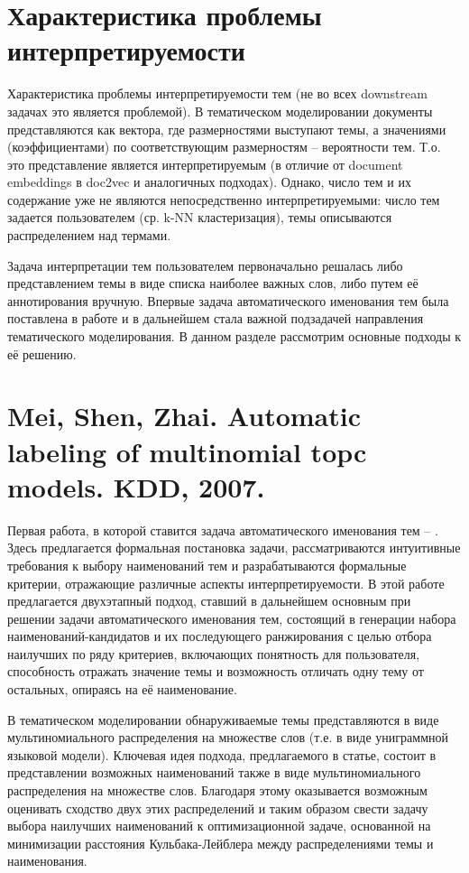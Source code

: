 \section{Характеристика проблемы интерпретируемости}

Характеристика проблемы интерпретируемости тем (не во всех downstream задачах это является проблемой). В тематическом моделировании документы представляются как вектора, где размерностями выступают темы, а значениями (коэффициентами) по соответствующим размерностям -- вероятности тем. Т.о. это представление является интерпретируемым (в отличие от document embeddings в doc2vec и аналогичных подходах). Однако, число тем и их содержание уже не являются непосредственно интерпретируемыми: число тем задается пользователем (ср. k-NN кластеризация), темы описываются распределением над термами.

Задача интерпретации тем пользователем первоначально решалась либо представлением темы в виде списка наиболее важных слов, либо путем её аннотирования вручную. Впервые задача автоматического именования тем была поставлена в работе \parencite{mei2007automatic} и в дальнейшем стала важной подзадачей направления тематического моделирования. В данном разделе рассмотрим основные подходы к её решению.

\section{Mei, Shen, Zhai. Automatic labeling of multinomial topc models. KDD, 2007.}

Первая работа, в которой ставится задача автоматического именования тем -- \parencite{mei2007automatic}. Здесь предлагается формальная постановка задачи, рассматриваются интуитивные требования к выбору наименований тем и разрабатываются формальные критерии, отражающие различные аспекты интерпретируемости. В этой работе предлагается двухэтапный подход, ставший в дальнейшем основным при решении задачи автоматического именования тем, состоящий в генерации набора  наименований-кандидатов и их последующего ранжирования с целью отбора наилучших по ряду критериев, включающих понятность для пользователя, способность отражать значение темы и возможность отличать одну тему от остальных, опираясь на её наименование.

В тематическом моделировании обнаруживаемые темы представляются в виде мультиномиального распределения на множестве слов (т.е. в виде униграммной языковой модели). Ключевая идея подхода, предлагаемого в статье, состоит в представлении возможных наименований также в виде мультиномиального распределения на множестве слов. Благодаря этому оказывается возможным оценивать сходство двух этих распределений и таким образом свести задачу выбора наилучших наименований к оптимизационной задаче, основанной на минимизации расстояния Кульбака-Лейблера между распределениями темы и наименования.

